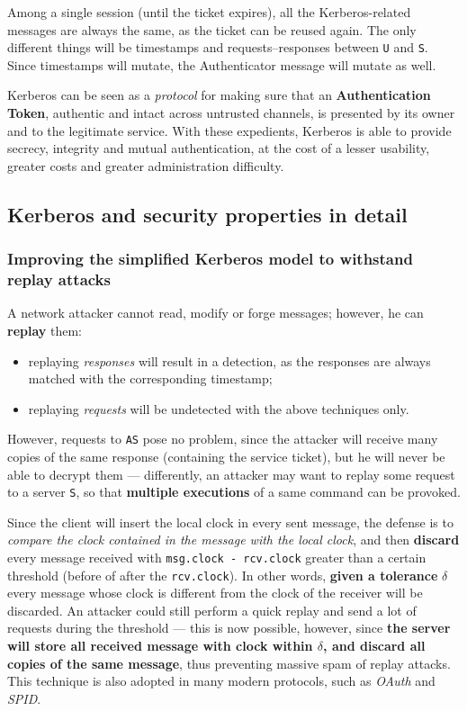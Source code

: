 \documentclass[10pt]{extreport}
\begin{document}
Among a single session (until the ticket expires), all the Kerberos\--related
messages are always the same, as the ticket can be reused again. The only
different things will be timestamps and requests\---responses between
\texttt{U} and \texttt{S}. Since timestamps will mutate, the Authenticator
message will mutate as well.

Kerberos can be seen as a \emph{protocol} for making sure that an
\textbf{Authentication Token}, authentic and intact across untrusted channels,
is presented by its owner and to the legitimate service. With these expedients,
Kerberos is able to provide secrecy, integrity and mutual authentication, at
the cost of a lesser usability, greater costs and greater administration
difficulty.


\subsection{Kerberos and security properties in detail}
\subsubsection{Improving the simplified Kerberos model to withstand replay attacks}

A network attacker cannot read, modify or forge messages; however, he can
\textbf{replay} them:
\begin{itemize}
    \item replaying \emph{responses} will result in a detection, as the
        responses are always matched with the corresponding timestamp;
    \item replaying \emph{requests} will be undetected with the above
        techniques only.
\end{itemize}

However, requests to \texttt{AS} pose no problem, since the attacker will
receive many copies of the same response (containing the service ticket), but
he will never be able to decrypt them --- differently, an attacker may want to
replay some request to a server \texttt{S}, so that \textbf{multiple
executions} of a same command can be provoked.

Since the client will insert the local clock in every sent message, the defense
is to \emph{compare the clock contained in the message with the local clock},
and then \textbf{discard} every message received with \texttt{msg.clock -
rcv.clock} greater than a certain threshold (before of after the
\texttt{rcv.clock}). In other words, \textbf{given a tolerance} $\delta$ every
message whose clock is different from the clock of the receiver will be
discarded. An attacker could still perform a quick replay and send a lot of
requests during the threshold --- this is now possible, however, since
\textbf{the server will store all received message with clock within $\delta$,
and discard all copies of the same message}, thus preventing massive spam of
replay attacks. This technique is also adopted in many modern protocols, such
as \emph{OAuth} and \emph{SPID}.
\end{document}
